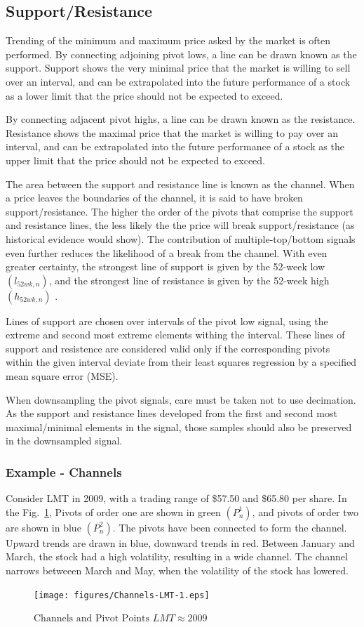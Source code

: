 \subsection{Support/Resistance}
%
Trending of the minimum and maximum price asked by the market is often performed.  
%
By connecting adjoining pivot lows, a line can be drawn known as the support.  Support shows the very minimal price that the market is willing to sell over an interval, and can be extrapolated into the future performance of a stock as a lower limit that the price should not be expected to exceed.  
\par
By connecting adjacent pivot highs, a line can be drawn known as the resistance.  Resistance shows the maximal price that the market is willing to pay over an interval, and can be extrapolated into the future performance of a stock as the upper limit that the price should not be expected to exceed.
\par
The area between the support and resistance line is known as the channel.  When a price leaves the boundaries of the channel, it is said to have broken support/resistance. The higher the order of the pivots that comprise the support and resistance lines, the less likely the the price will break support/resistance (as historical evidence would show).  The contribution of multiple-top/bottom signals even further reduces the likelihood of a break from the channel.  With even greater certainty, the strongest line of support is given by the 52-week low $(l_{52 wk,n})$,  and the strongest line of resistance is given by the 52-week high $(h_{52 wk, n})$ \cite{Wealth}.
\par
Lines of support are chosen over intervals of the pivot low signal, using the extreme and second most extreme elements withing the interval.  These lines of support and resistence are considered valid only if the corresponding pivots within the given interval deviate from their least squares regression by a specified mean square error (MSE).
\par
When downsampling the pivot signals, care must be taken not to use decimation.  As the support and resistance lines developed from the first and second most maximal/minimal elements in the signal, those samples should also be preserved in the downsampled signal.
\par
%
\subsubsection{Example - Channels}
%
Consider LMT in 2009, with a trading range of \$57.50 and \$65.80 per share.  In the Fig.~\ref{fig:channels}, Pivots of order one are shown in green $(P_{n}^{1})$, and pivots of order two are shown in blue $(P_{n}^{2})$.  The pivots have been connected to form the channel.  Upward trends are drawn in blue, downward trends in red. Between January and March, the stock had a high volatility, resulting in a wide channel.  The channel narrows betweeen March and May, when the volatility of the stock has lowered.
%
\begin{figure}[ht]\centering
\label{fig:channels}
\texttt{[image: figures/Channels-LMT-1.eps]}
\caption{$\mbox{Channels and Pivot Points } LMT \approx 2009$}
\end{figure}
%
